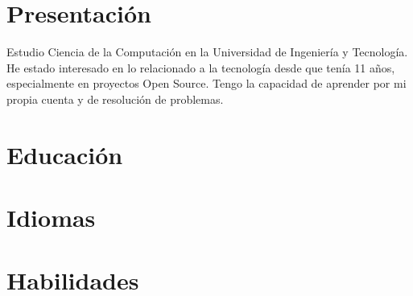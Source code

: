 \documentclass[10pt, a4paper]{moderncv}
\begin{document}
\maketitle
\section{Presentación}
Estudio Ciencia de la Computación en la Universidad de Ingeniería y Tecnología.
He estado interesado en lo relacionado a la tecnología desde que tenía 11 años,
especialmente en proyectos Open Source.
Tengo la capacidad de aprender por mi propia cuenta y de resolución de problemas.

\section{Educación}


\section{Idiomas}


\section{Habilidades}
\end{document}
